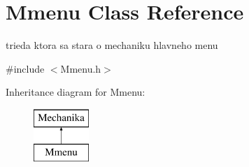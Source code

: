 \hypertarget{class_mmenu}{\section{Mmenu Class Reference}
\label{class_mmenu}
}


trieda ktora sa stara o mechaniku hlavneho menu  




{\ttfamily \#include $<$Mmenu.\-h$>$}

Inheritance diagram for Mmenu\-:\begin{figure}[H]
\begin{center}
\leavevmode
\includegraphics[height=2.000000cm]{class_mmenu}
\end{center}
\end{figure}

